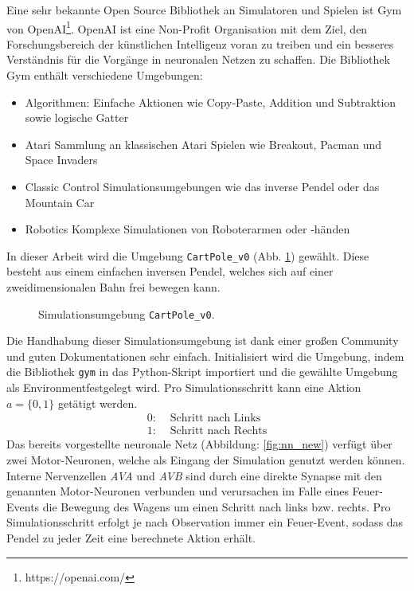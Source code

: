 	Eine sehr bekannte Open Source Bibliothek an Simulatoren und Spielen ist Gym von OpenAI\footnote{https://openai.com/}. OpenAI ist eine Non-Profit Organisation mit dem Ziel, den Forschungsbereich der künstlichen Intelligenz voran zu treiben und ein besseres Verständnis für die Vorgänge in neuronalen Netzen zu schaffen. Die Bibliothek Gym enthält verschiedene Umgebungen:
	\begin{itemize}
		\item Algorithmen:
		\subitem Einfache Aktionen wie Copy-Paste, Addition und Subtraktion sowie logische Gatter
		\item Atari
		\subitem Sammlung an klassischen Atari Spielen wie Breakout, Pacman und Space Invaders
		\item Classic Control
		\subitem Simulationsumgebungen wie das inverse Pendel oder das Mountain Car
		\item Robotics
		\subitem Komplexe Simulationen von Roboterarmen oder -händen
	\end{itemize}
	In dieser Arbeit wird die Umgebung \texttt{CartPole\_v0} (Abb. \ref{fig:imp_cartpole}) gewählt. Diese besteht aus einem einfachen inversen Pendel, welches sich auf einer zweidimensionalen Bahn frei bewegen kann.
	\begin{figure}[H]
		\centering
		\def\svgwidth{12cm}
		
		\caption{Simulationsumgebung \texttt{CartPole\_v0}.}
		\label{fig:imp_cartpole}
	\end{figure}
	Die Handhabung dieser Simulationsumgebung ist dank einer großen Community und guten Dokumentationen sehr einfach. Initialisiert wird die Umgebung, indem die Bibliothek \texttt{gym} in das Python-Skript importiert und die gewählte Umgebung als \glqq Environment\grqq{}festgelegt wird. Pro Simulationsschritt kann eine Aktion $a = \{0,1\}$ getätigt werden.
	\begin{align*}
		0 :& \text{ Schritt nach Links}\\
		1 :& \text{ Schritt nach Rechts}
	\end{align*}
	Das bereits vorgestellte neuronale Netz (Abbildung: \ref{fig:nn_new}) verfügt über zwei Motor-Neuronen, welche als Eingang der Simulation genutzt werden können. Interne Nervenzellen \textit{AVA} und \textit{AVB} sind durch eine direkte Synapse mit den genannten Motor-Neuronen verbunden und verursachen im Falle eines Feuer-Events die Bewegung des Wagens um einen Schritt nach links bzw. rechts. Pro Simulationsschritt erfolgt je nach Observation immer ein Feuer-Event, sodass das Pendel zu jeder Zeit eine berechnete Aktion erhält.
